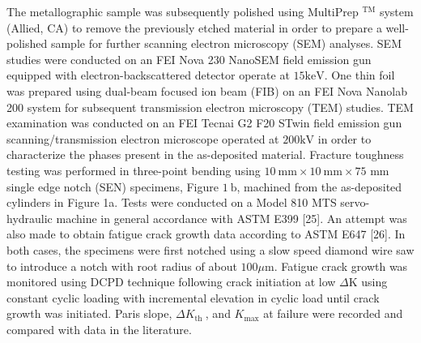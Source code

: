 \documentclass[10pt]{article}
\begin{document}
The metallographic sample was subsequently polished using MultiPrep ${ }^{\mathrm{TM}}$ system (Allied, CA) to remove the previously etched material in order to prepare a well-polished sample for further scanning electron microscopy (SEM) analyses. SEM studies were conducted on an FEI Nova 230 NanoSEM field emission gun equipped with electron-backscattered detector operate at $15 \mathrm{keV}$. One thin foil was prepared using dual-beam focused ion beam (FIB) on an FEI Nova Nanolab 200 system for subsequent transmission electron microscopy (TEM) studies. TEM examination was conducted on an FEI Tecnai G2 F20 STwin field emission gun scanning/transmission electron microscope operated at $200 \mathrm{kV}$ in order to characterize the phases present in the as-deposited material. Fracture toughness testing was performed in three-point bending using $10 \mathrm{~mm} \times 10 \mathrm{~mm} \times 75$ $\mathrm{mm}$ single edge notch (SEN) specimens, Figure $1 \mathrm{~b}$, machined from the as-deposited cylinders in Figure 1a. Tests were conducted on a Model 810 MTS servo-hydraulic machine in general accordance with ASTM E399 [25]. An attempt was also made to obtain fatigue crack growth data according to ASTM E647 [26]. In both cases, the specimens were first notched using a slow speed diamond wire saw to introduce a notch with root radius of about $100 \mu \mathrm{m}$. Fatigue crack growth was monitored using DCPD technique following crack initiation at low $\Delta \mathrm{K}$ using constant cyclic loading with incremental elevation in cyclic load until crack growth was initiated. Paris slope, $\Delta K_{\text {th }}$, and $K_{\max }$ at failure were recorded and compared with data in the literature.
\end{document}

